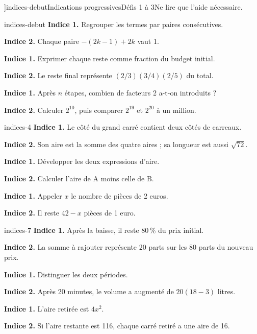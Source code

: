 \editionPage[\pdfbookmark[0]{Indications des défis}{bm-indices-debut-parent}]{indices-debut}{Indications progressives}{Défis 1 à 3}{Ne lire que l’aide nécessaire.}
\begin{blocEdition}{indices-debut}
\textbf{Indice 1.} Regrouper les termes par paires consécutives.\par\medskip\textbf{Indice 2.} Chaque paire $-(2k-1)+2k$ vaut 1.\par
{}\textbf{Indice 1.} Exprimer chaque reste comme fraction du budget initial.\par\medskip\textbf{Indice 2.} Le reste final représente $(2/3)(3/4)(2/5)$ du total.\par
{}\textbf{Indice 1.} Après $n$ étapes, combien de facteurs 2 a-t-on introduits ?\par\medskip\textbf{Indice 2.} Calculer $2^{10}$, puis comparer $2^{19}$ et $2^{20}$ à un million.\par

\end{blocEdition}
\begin{blocEdition}{indices-4}
\textbf{Indice 1.} Le côté du grand carré contient deux côtés de carreaux.\par\medskip\textbf{Indice 2.} Son aire est la somme des quatre aires ; sa longueur est aussi $\sqrt{72}$.\par
{}\textbf{Indice 1.} Développer les deux expressions d’aire.\par\medskip\textbf{Indice 2.} Calculer l’aire de A moins celle de B.\par
{}\textbf{Indice 1.} Appeler $x$ le nombre de pièces de 2 euros.\par\medskip\textbf{Indice 2.} Il reste $42-x$ pièces de 1 euro.\par

\end{blocEdition}
\begin{blocEdition}{indices-7}
\textbf{Indice 1.} Après la baisse, il reste 80\,\% du prix initial.\par\medskip\textbf{Indice 2.} La somme à rajouter représente 20 parts sur les 80 parts du nouveau prix.\par
{}\textbf{Indice 1.} Distinguer les deux périodes.\par\medskip\textbf{Indice 2.} Après 20 minutes, le volume a augmenté de $20(18-3)$ litres.\par
{}\textbf{Indice 1.} L’aire retirée est $4x^2$.\par\medskip\textbf{Indice 2.} Si l’aire restante est 116, chaque carré retiré a une aire de 16.\par

\end{blocEdition}
